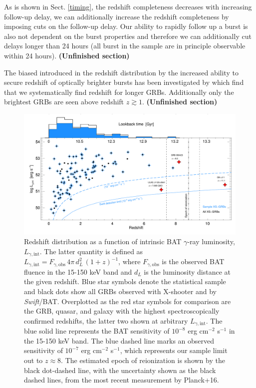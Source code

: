 \documentclass{aa}    %
\newcommand\todo[1]{\textbf{(#1)}}
\begin{document}
As is shown in Sect. \ref{timing}, the redshift completeness
decreases with increasing follow-up delay, we can additionally increase the
redshift completeness by imposing cuts on the follow-up delay. Our ability to
rapidly follow up a burst is also not dependent on the burst properties and
therefore we can additionally cut delays longer than 24 hours (all burst in the
sample are in principle observable within 24 hours). \todo{Unfinished section}


The biased introduced in the redshift distribution by the increased ability to
secure redshift of optically brighter bursts has been investigated by
\citet{Turpin2016} which find that we systematically find redshift for longer
GRBs. Additionally only the brightest GRBs are seen above redshift $z \gtrsim
1$. \todo{Unfinished section}


\begin{figure}
	\centering
	\includegraphics[width=16cm]{figures/XSGRB_zBATlum.pdf}
	\caption{Redshift distribution as a function of intrinsic BAT $\gamma$-ray
		luminosity, $L_{\gamma,\mathrm{int}}$. The latter quantity is defined as
		$L_{\gamma,\mathrm{int}} = F_{\gamma,\mathrm{obs}}\,4 \pi\,d_L^2\,(1+z)^{-1}$,
		where $F_{\gamma,\mathrm{obs}}$ is the observed BAT fluence in the 15-150 keV
		band and $d_L$ is the luminosity distance at the given redshift. Blue star
		symbols denote the statistical sample and black dots show all GRBs observed
		with X-shooter and by \textit{Swift}/BAT. Overplotted as the red star symbols
		for comparison are the GRB, quasar, and galaxy with the highest
		spectroscopically confirmed redshifts, the latter two shown at arbitrary
		$L_{\gamma,\mathrm{int}}$. The blue solid line represents the BAT sensitivity
		of $10^{-8}$ erg cm$^{-2}$ s$^{-1}$ in the 15-150 keV band. The blue dashed
		line marks an observed sensitivity of $10^{-7}$ erg cm$^{-2}$ s$^{-1}$, which
		represents our sample limit out to $z\approx 8$. The estimated epoch of
		reionization is shown by the black dot-dashed line, with the uncertainty shown
		as the black dashed lines, from the most recent measurement by Planck+16.}
	\label{fig:z}
\end{figure}
\end{document}
